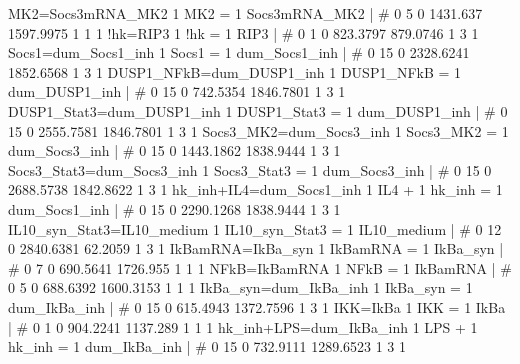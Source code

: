 MK2=Socs3mRNA_MK2                                   	1 MK2 = 1 Socs3mRNA_MK2 	| 	# 	0              5              0       1431.637      1597.9975              1              1              1 
!hk=RIP3                                            	1 !hk = 1 RIP3 	| 	# 	0             1             0      823.3797      879.0746             1             3             1 
Socs1=dum_Socs1_inh                                 	1 Socs1 = 1 dum_Socs1_inh 	| 	# 	0             15              0      2328.6241      1852.6568              1              3              1 
DUSP1_NFkB=dum_DUSP1_inh                            	1 DUSP1_NFkB = 1 dum_DUSP1_inh 	| 	# 	0             15              0       742.5354      1846.7801              1              3              1 
DUSP1_Stat3=dum_DUSP1_inh                           	1 DUSP1_Stat3 = 1 dum_DUSP1_inh 	| 	# 	0             15              0      2555.7581      1846.7801              1              3              1 
Socs3_MK2=dum_Socs3_inh                             	1 Socs3_MK2 = 1 dum_Socs3_inh 	| 	# 	0             15              0      1443.1862      1838.9444              1              3              1 
Socs3_Stat3=dum_Socs3_inh                           	1 Socs3_Stat3 = 1 dum_Socs3_inh 	| 	# 	0             15              0      2688.5738      1842.8622              1              3              1 
hk_inh+IL4=dum_Socs1_inh                            	1 IL4 + 1 hk_inh = 1 dum_Socs1_inh 	| 	# 	0             15              0      2290.1268      1838.9444              1              3              1 
IL10_syn_Stat3=IL10_medium                          	1 IL10_syn_Stat3 = 1 IL10_medium 	| 	# 	0             12              0      2840.6381        62.2059              1              3              1 
IkBamRNA=IkBa_syn                                   	1 IkBamRNA = 1 IkBa_syn 	| 	# 	0              7              0       690.5641       1726.955              1              1              1 
NFkB=IkBamRNA                                       	1 NFkB = 1 IkBamRNA 	| 	# 	0              5              0       688.6392      1600.3153              1              1              1 
IkBa_syn=dum_IkBa_inh                               	1 IkBa_syn = 1 dum_IkBa_inh 	| 	# 	0             15              0       615.4943      1372.7596              1              3              1 
IKK=IkBa                                            	1 IKK = 1 IkBa 	| 	# 	0              1              0       904.2241       1137.289              1              1              1 
hk_inh+LPS=dum_IkBa_inh                             	1 LPS + 1 hk_inh = 1 dum_IkBa_inh 	| 	# 	0             15              0       732.9111      1289.6523              1              3              1 
